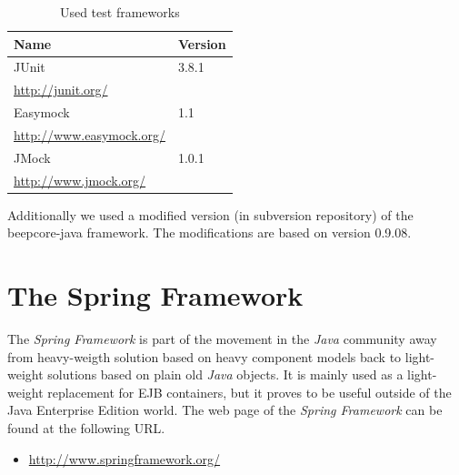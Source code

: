 \begin{table}[H]
 \centering
 \begin{tabular}{|l|l|}
  \hline
   \multicolumn{1}{|p{4.5in}|}{\bfseries{\textsf{Name}}} &
   \multicolumn{1}{|p{0.6in}|}{\bfseries{\textsf{Version}}} \\
  \hline
   \multicolumn{1}{|p{4.5in}|}{JUnit} &
   \multicolumn{1}{|p{0.6in}|}{3.8.1} \\
   \multicolumn{1}{|p{4.5in}|}{\footnotesize{\href{http://junit.org/}{http://junit.org/}}} &
   \multicolumn{1}{|p{0.6in}|}{} \\

  \hline
   \multicolumn{1}{|p{4.5in}|}{Easymock} &
   \multicolumn{1}{|p{0.6in}|}{1.1} \\
   \multicolumn{1}{|p{4.5in}|}{\footnotesize{\href{http://www.easymock.org/}{http://www.easymock.org/}}} &
   \multicolumn{1}{|p{0.6in}|}{} \\

  \hline
   \multicolumn{1}{|p{4.5in}|}{JMock} &
   \multicolumn{1}{|p{0.6in}|}{1.0.1} \\
   \multicolumn{1}{|p{4.5in}|}{\footnotesize{\href{http://www.jmock.org/}{http://www.jmock.org/}}} &
   \multicolumn{1}{|p{0.6in}|}{} \\

  \hline
 \end{tabular}
 \caption{Used test frameworks}
\end{table}

Additionally we used a modified version (in subversion repository) of the
beepcore-java framework. The modifications are based on version 0.9.08.


\section{The Spring Framework}

The \emph{Spring Framework} is part of the movement in the \emph{Java}
community away from heavy-weigth solution based on heavy component models
back to light-weight solutions based on plain old \emph{Java} objects. It
is mainly used as a light-weight replacement for EJB containers, but it
proves to be useful outside of the Java Enterprise Edition world. The 
web page of the \emph{Spring Framework} can be found at the following
URL.

\begin{itemize}
 \item \href{http://www.springframework.org/}{http://www.springframework.org/}
\end{itemize}

